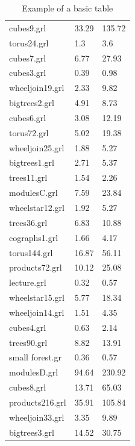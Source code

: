 \documentclass[11pt]{article}
\begin{document}
\begin{table}[h!]
\begin{tabularx}{\textwidth}{|l|X|X|}
		cubes9.grl & 33.29 & 135.72 \\
		torus24.grl & 1.3 & 3.6 \\
		cubes7.grl & 6.77 & 27.93 \\
		cubes3.grl & 0.39 & 0.98 \\
		wheeljoin19.grl & 2.33 & 9.82 \\
		bigtrees2.grl & 4.91 & 8.73 \\
		cubes6.grl & 3.08 & 12.19 \\
		torus72.grl & 5.02 & 19.38 \\
		wheeljoin25.grl & 1.88 & 5.27 \\
		bigtrees1.grl & 2.71 & 5.37 \\
		trees11.grl & 1.54 & 2.26 \\
		modulesC.grl & 7.59 & 23.84 \\
		wheelstar12.grl & 1.92 & 5.27 \\
		trees36.grl & 6.83 & 10.88 \\
		cographs1.grl & 1.66 & 4.17 \\
		torus144.grl & 16.87 & 56.11 \\
		products72.grl & 10.12 & 25.08 \\
		lecture.grl & 0.32 & 0.57 \\
		wheelstar15.grl & 5.77 & 18.34 \\
		wheeljoin14.grl & 1.51 & 4.35 \\
		cubes4.grl & 0.63 & 2.14 \\
		trees90.grl & 8.82 & 13.91 \\
		small forest.gr & 0.36 & 0.57 \\
		modulesD.grl & 94.64 & 230.92 \\
		cubes8.grl & 13.71 & 65.03 \\
		products216.grl & 35.91 & 105.84 \\
		wheeljoin33.grl & 3.35 & 9.89 \\
		bigtrees3.grl & 14.52 & 30.75 \\
        \hline
    \end{tabularx}
    \caption{Example of a basic table}
    \label{tab:1}
\end{table}
\end{document}
